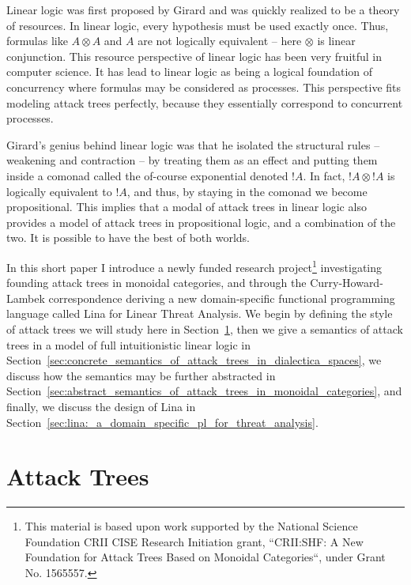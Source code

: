 \documentclass{llncs}
\begin{document}
Linear logic was first proposed by Girard \cite{?} and was quickly
realized to be a theory of resources.  In linear logic, every
hypothesis must be used exactly once.  Thus, formulas like $A \otimes
A$ and $A$ are not logically equivalent -- here $\otimes$ is linear
conjunction.  This resource perspective of linear logic has been very
fruitful in computer science.  It has lead to linear logic as being a
logical foundation of concurrency \cite{?} where formulas may be
considered as processes.  This perspective fits modeling attack trees
perfectly, because they essentially correspond to concurrent
processes.

Girard's genius behind linear logic was that he isolated the
structural rules -- weakening and contraction -- by treating them as
an effect and putting them inside a comonad called the of-course
exponential denoted $!A$.  In fact, $!A \otimes !A$ is logically
equivalent to $!A$, and thus, by staying in the comonad we become
propositional.  This implies that a modal of attack trees in linear
logic also provides a model of attack trees in propositional logic,
and a combination of the two.  It is possible to have the best of both
worlds.

In this short paper I introduce a newly funded research
project\footnote{This material is based upon work supported by the
  National Science Foundation CRII CISE Research Initiation grant,
  ``CRII:SHF: A New Foundation for Attack Trees Based on Monoidal
  Categories``, under Grant No. 1565557.}  investigating founding
attack trees in monoidal categories, and through the
Curry-Howard-Lambek correspondence deriving a new domain-specific
functional programming language called Lina for Linear Threat
Analysis.  We begin by defining the style of attack trees we will
study here in Section~\ref{sec:attack_trees}, then we give a semantics
of attack trees in a model of full intuitionistic linear logic in
Section~\ref{sec:concrete_semantics_of_attack_trees_in_dialectica_spaces},
we discuss how the semantics may be further abstracted in
Section~\ref{sec:abstract_semantics_of_attack_trees_in_monoidal_categories},
and finally, we discuss the design of Lina in
Section~\ref{sec:lina:_a_domain_specific_pl_for_threat_analysis}.

\section{Attack Trees}
\label{sec:attack_trees}

\end{document}

